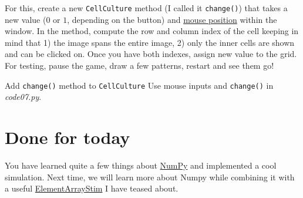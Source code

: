 \documentclass[
]{book}
\begin{document}
For this, create a new \texttt{CellCulture} method (I called it \texttt{change()}) that takes a new value (\(0\) or \(1\), depending on the button) and \href{https://psychopy.org/api/event.html\#psychopy.event.Mouse.getPos}{mouse position} within the window. In the method, compute the row and column index of the cell keeping in mind that 1) the image spans the entire image, 2) only the inner cells are shown and can be clicked on. Once you have both indexes, assign new value to the grid. For testing, pause the game, draw a few patterns, restart and see them go!

Add \texttt{change()} method to \texttt{CellCulture}
Use mouse inputs and \texttt{change()} in \emph{code07.py}.

\hypertarget{done-for-today}{%
\section{Done for today}\label{done-for-today}}

You have learned quite a few things about \href{https://numpy.org/}{NumPy} and implemented a cool simulation. Next time, we will learn more about Numpy while combining it with a useful \href{https://psychopy.org/api/visual/elementarraystim.html\#psychopy.visual.ElementArrayStim}{ElementArrayStim} I have teased about.

  
\end{document}
